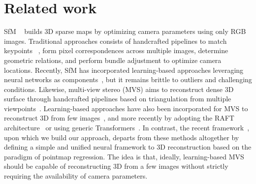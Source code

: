 \section{Related work}
\label{sec:related}


SfM ~\cite{hartley2003multiple, crandall2012sfm, jiang2013global,cui2017hsfm, schonberger2016structure} builds 3D sparse maps by optimizing camera parameters using only RGB images. 
Traditional approaches consists of handcrafted pipelines to match keypoints ~\cite{harris1988combined, lowe2004distinctive, bay2006surf, rosten2006machine, barroso2019key}, form pixel correspondences across multiple images, determine geometric relations, and perform bundle adjustment to optimize camera locations.
Recently, SfM has incorporated learning-based approaches leveraging neural networks as components~\cite{yi2016lift, barath2023affineglue, chen2022aspanformer, lindenberger2023lightglue, sarlin2020superglue, sun2021loftr, tang2022quadtree, wang2023guiding}, but it remains brittle to outliers and challenging conditions.
Likewise, multi-view stereo (MVS) aims to reconstruct dense 3D surface through handcrafted pipelines based on triangulation from multiple viewpoints~\cite{furukawa2015multi, galliani2015massively, schonberger2016pixelwise}.
Learning-based approaches have also been incorporated for MVS to reconstruct 3D from few images~\cite{niemeyer2020differentiable,wiles2020synsin, yariv2020multiview, leroy2021volume, sitzmann2019srns,jang2021codenerf}, and more recently by adopting the RAFT architecture~\cite{cermvs} or using generic Transformers~\cite{cao2024mvsformer++}.
In contrast, the recent \duster{} framework~\cite{wang2024dust3r,leroy2024mast3r}, upon which we build our approach, departs from these methods altogether by defining a simple and unified neural framework to 3D reconstruction based on the paradigm of pointmap regression.
The idea is that, ideally, learning-based MVS should be capable of reconstructing 3D from a few images without strictly requiring the availability of camera parameters.

